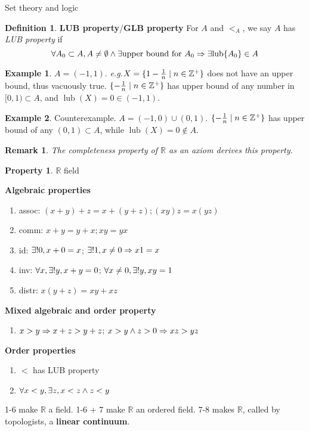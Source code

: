 \documentclass{report}
\newtheorem*{remark}{Remark}
\theoremstyle{definition}
\newtheorem{definition}{Definition}[chapter]
\newtheorem{example}{Example}[definition]
\newtheorem{property}{Property}[chapter]
\newcommand{\defn}[1]{\textbf{#1}\label{#1}}
\newcommand{\set}[1]{\ensuremath\{#1\}}
\newcommand{\eg}{\textit{e.g.}\xspace}
\newcommand{\RA}{\ensuremath\Rightarrow}
\newcommand{\ZZ}{\mathbb{Z}}
\newcommand{\RR}{\mathbb{R}}
\newcommand{\A}{$A$\xspace}
\newcommand{\ex}{\ensuremath\exists}
\begin{document}
\begin{chapter}{Set theory and logic}
  \begin{definition}{\defn{LUB property}/\defn{GLB property}}
    For $A$ and $<_A$, we say \A has \emph{LUB property} if
    $$\forall A_0\subset A,A\not=\emptyset\land\ex \text{upper bound for }
    A_0 \RA \ex \text{lub$\{A_0\}$}\in A$$
  \end{definition}
  \begin{example}
    $A=(-1,1)$. \eg $X=\set{1-\frac{1}{n}\mid n\in\ZZ^+}$ does not have an
    upper bound, thus vacuously true. $\set{-\frac{1}{n}\mid
      n\in\ZZ^+}$ has upper bound of any number in $[0,1)\subset A$, and
    $\operatorname{lub}(X)=0\in (-1,1)$.
  \end{example}
  \begin{example}
    Counterexample. $A=(-1,0)\cup(0,1)$. $\set{-\frac{1}{n}\mid n\in\ZZ^+}$ has
    upper bound of any $(0,1)\subset A$, while
    $\operatorname{lub}(X)=0\not\in A$.
  \end{example}
  \begin{remark}
    The completeness property of $\RR$ as an axiom derives this property.
  \end{remark}

  \begin{property}{$\RR$ field}

    \textbf{Algebraic properties}
    \begin{enumerate}
    \item assoc: $(x+y)+z=x+(y+z); (xy)z=x(yz)$
    \item comm: $x+y=y+x; xy=yx$
    \item id: $\ex!0, x+0=x$; $\ex!1,x\not=0\RA x1=x$
    \item inv: $\forall x,\ex!y,x+y=0$; $\forall x\not=0,\ex!y,xy=1$
    \item distr: $x(y+z)=xy+xz$
    \end{enumerate}

    \textbf{Mixed algebraic and order property}
    \begin{enumerate}[resume]
    \item $x>y\RA x+z>y+z$; $x>y\land z>0\RA xz>yz$
    \end{enumerate}

    \textbf{Order properties}
    \begin{enumerate}[resume]
    \item $<$ has LUB property
    \item $\forall x<y,\ex z, x<z\land z<y$
    \end{enumerate}
  \end{property}

  1-6 make $\RR$ a field. 1-6 + 7 make $\RR$ an ordered field. 7-8
  makes $\RR$, called by topologists, a \defn{linear continuum}.
\end{chapter}
\end{document}
